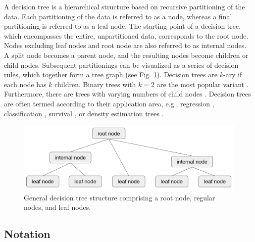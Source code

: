 \documentclass[a4paper, 11pt]{article}
\begin{document}
A decision tree is a hierarchical structure based on recursive partitioning of the data. Each partitioning of the data is referred to as a node, whereas a final partitioning is referred to as a leaf node.
The starting point of a decision tree, which encompasses the entire, unpartitioned data, corresponds to the root node. Nodes excluding leaf nodes and root node are also referred to as internal nodes.
A split node becomes a parent node, and the resulting nodes become children or child nodes. Subsequent partitionings can be visualized as a series of decision rules, which together form a tree graph (see Fig. \ref{fig:tree_structure}). Decision trees are $k$-ary if each node has $k$ children.
Binary trees with $k = 2$ are the most popular variant \cite{hastie_elemstatlearn}. Furthermore, there are trees with varying numbers of child nodes \cite{quinlan_c45}. Decision trees are often termed according to their application area, e.g., regression \cite{cart_1}, classification \cite{quinlan_c45, cart_1, kass_chaid}, survival \cite{derose_survival_tree}, or density estimation trees \cite{ram_density_estimation_tree}.

\begin{figure}
    \centering
    \includegraphics[width = 0.6 \linewidth]{thesis/figure/decision_tree_structure.png}
    \caption{General decision tree structure comprising a root node, regular nodes, and leaf nodes.}
    \label{fig:tree_structure}
\end{figure}

\subsection{Notation}
\end{document}
